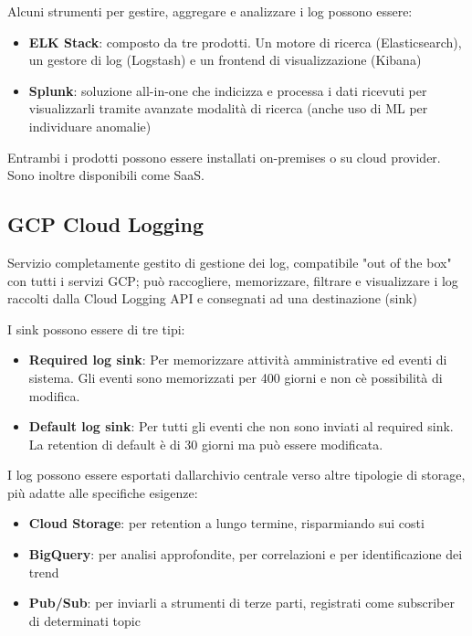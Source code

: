 Alcuni strumenti per gestire, aggregare e analizzare i log possono
essere:

\begin{itemize}
\item
  \textbf{ELK Stack}: composto da tre prodotti. Un motore di ricerca
  (Elasticsearch), un gestore di log (Logstash) e un frontend di
  visualizzazione (Kibana)
\item
  \textbf{Splunk}: soluzione all-in-one che indicizza e processa i dati
  ricevuti per visualizzarli tramite avanzate modalità di ricerca (anche
  uso di ML per individuare anomalie)
\end{itemize}

Entrambi i prodotti possono essere installati on-premises o su cloud
provider. Sono inoltre disponibili come SaaS.

\subsection{GCP Cloud Logging}\label{gcp-cloud-logging}

Servizio completamente gestito di gestione dei log, compatibile "out of
the box" con tutti i servizi GCP; può raccogliere, memorizzare, filtrare
e visualizzare i log raccolti dalla Cloud Logging API e consegnati ad
una destinazione (sink)

I sink possono essere di tre tipi:

\begin{itemize}
\item
  \textbf{Required log sink}: Per memorizzare attività amministrative ed
  eventi di sistema. Gli eventi sono memorizzati per 400 giorni e non
  c\textquotesingle è possibilità di modifica.
\item
  \textbf{Default log sink}: Per tutti gli eventi che non sono inviati
  al required sink. La retention di default è di 30 giorni ma può essere
  modificata.
\end{itemize}

I log possono essere esportati dall\textquotesingle archivio centrale
verso altre tipologie di storage, più adatte alle specifiche esigenze:

\begin{itemize}
\item
  \textbf{Cloud Storage}: per retention a lungo termine, risparmiando
  sui costi
\item
  \textbf{BigQuery}: per analisi approfondite, per correlazioni e per
  identificazione dei trend
\item
  \textbf{Pub/Sub}: per inviarli a strumenti di terze parti, registrati
  come subscriber di determinati topic
\end{itemize}


